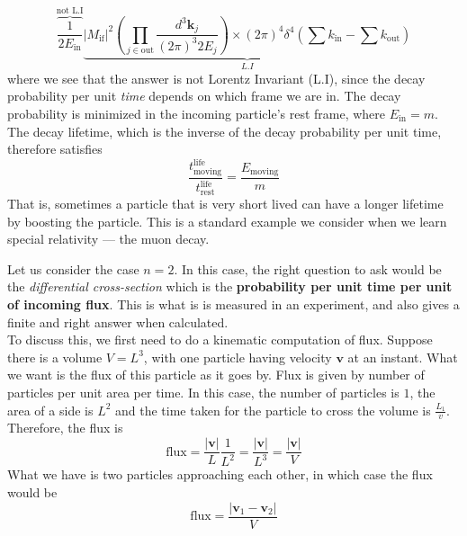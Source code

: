 \documentclass[11pt, notitlepage]{report}
\numberwithin{equation}{section}
\begin{document}
    \begin{equation*}
        \overbrace{\frac{1}{2E_{\text{in}}}}^{\text{not L.I}} \underbrace{| M_{\text{if}}|^2 \left(\prod_{j\in\text{out}}\frac{d^3\textbf{k}_j}{(2\pi)^3 2E_j}\right) \times (2\pi)^4\delta^4\left(\sum k_{\text{in}} - \sum k_{\text{out}} \right)}_{L.I}
    \end{equation*}
    where we see that the answer is not Lorentz Invariant (L.I), since the decay probability per unit \textit{time} depends on which frame we are in. The decay probability is minimized in the incoming particle's rest frame, where \(E_{\text{in}} = m\). The decay lifetime, which is the inverse of the decay probability per unit time, therefore satisfies
    \begin{equation*}
        \frac{t^{\text{life}}_{\text{moving}}}{t^{\text{life}}_{\text{rest}}} = \frac{E_{\text{moving}}}{m}
    \end{equation*}
    That is, sometimes a particle that is very short lived can have a longer lifetime by boosting the particle. This is a standard example we consider when we learn special relativity — the muon decay.

    Let us consider the case \(n=2\). In this case, the right question to ask would be the \textit{differential cross-section} which is the \textbf{probability per unit time per unit of incoming flux}. This is what is is measured in an experiment, and also gives a finite and right answer when calculated. \\
    
    To discuss this, we first need to do a kinematic computation of flux. Suppose there is a volume \(V = L^3\), with one particle having velocity \(\textbf{v}\) at an instant. What we want is the flux of this particle as it goes by. Flux is given by number of particles per unit area per time. In this case, the number of particles is \(1\), the area of a side is \(L^2\) and the time taken for the particle to cross the volume is \(\displaystyle\frac{L_1}{v}\). Therefore, the flux is 
    \begin{equation*}
        \text{flux} = \frac{|\textbf{v}|}{L}\frac{1}{L^2} = \frac{|\textbf{v}|}{L^3} = \frac{|\textbf{v}|}{V}
    \end{equation*}
    What we have is two particles approaching each other, in which case the flux would be 
    \begin{equation*}
        \text{flux} = \frac{|\textbf{v}_1 - \textbf{v}_2|}{V}
    \end{equation*}
\end{document}
